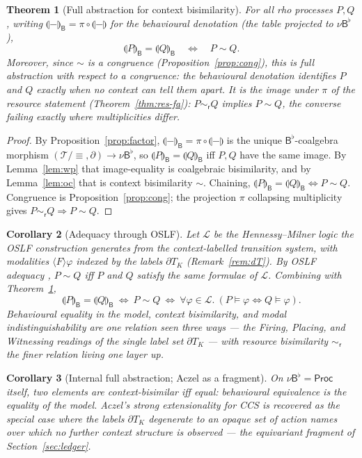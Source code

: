 \documentclass[11pt]{article}
\newcommand{\Proc}{\mathsf{Proc}}
\newcommand{\B}{\mathsf{B}}
\newcommand{\sem}[1]{\llparenthesis #1\rrparenthesis}   %
\newcommand{\bis}{\sim}
\newcommand{\scong}{\equiv}
\newcommand{\DK}{\partial T_{K}}               %
\newcommand{\resbis}{\sim_{\mathsf{r}}}        %
\theoremstyle{plain}
\newtheorem{theorem}{Theorem}
\newtheorem{corollary}[theorem]{Corollary}
\theoremstyle{definition}
\begin{document}
\begin{theorem}[Full abstraction for context bisimilarity]\label{thm:fa}
For all rho processes $P,Q$, writing $\sem{-}_{\B}=\pi\circ\sem{-}$ for the
behavioural denotation (the table projected to $\nu{\B^{\flat}}$),
\[
  \sem P_{\B}=\sem Q_{\B} \quad\Longleftrightarrow\quad P\bis Q .
\]
Moreover, since $\bis$ is a congruence (Proposition~\ref{prop:cong}), this is full
abstraction with respect to a congruence: the behavioural denotation identifies $P$
and $Q$ exactly when no context can tell them apart. It is the image under $\pi$ of
the resource statement (Theorem~\ref{thm:res-fa}): $P\resbis Q$ implies $P\bis Q$,
the converse failing exactly where multiplicities differ.
\end{theorem}
\begin{proof}
By Proposition~\ref{prop:factor}, $\sem{-}_{\B}=\pi\circ\sem{-}$ is the unique
$\B^{\flat}$-coalgebra morphism $(\mathcal T/{\scong},\partial)\to\nu{\B^{\flat}}$,
so $\sem P_{\B}=\sem Q_{\B}$ iff $P,Q$ have the same image. By Lemma~\ref{lem:wp}
that image-equality is coalgebraic bisimilarity, and by Lemma~\ref{lem:oc} that is
context bisimilarity $\bis$. Chaining, $\sem P_{\B}=\sem Q_{\B}\iff P\bis Q$.
Congruence is Proposition~\ref{prop:cong}; the projection $\pi$ collapsing
multiplicity gives $P\resbis Q\Rightarrow P\bis Q$.
\end{proof}

\begin{corollary}[Adequacy through OSLF]\label{cor:oslf}
Let $\mathcal L$ be the Hennessy--Milner logic the OSLF construction generates from
the context-labelled transition system, with modalities $\langle F\rangle\varphi$
indexed by the labels $\DK$ (Remark~\ref{rem:dT}). By OSLF adequacy
\cite{meredithwells}, $P\bis Q$ iff $P$ and $Q$ satisfy the same formulae of
$\mathcal L$. Combining with Theorem~\ref{thm:fa},
\[
  \sem P_{\B}=\sem Q_{\B}
  \ \Longleftrightarrow\
  P\bis Q
  \ \Longleftrightarrow\
  \forall\varphi\in\mathcal L.\ (P\models\varphi\Leftrightarrow Q\models\varphi).
\]
Behavioural equality in the model, context bisimilarity, and modal
indistinguishability are one relation seen three ways --- the Firing, Placing, and
Witnessing readings of the single label set $\DK$ --- with resource bisimilarity
$\resbis$ the finer relation living one layer up.
\end{corollary}

\begin{corollary}[Internal full abstraction; Aczel as a fragment]\label{cor:internal}
On $\nu{\B^{\flat}}=\Proc$ itself, two elements are context-bisimilar iff equal:
behavioural equivalence is the equality of the model. Aczel's strong extensionality
for CCS is recovered as the special case where the labels $\DK$ degenerate to an
opaque set of action names over which no further context structure is observed ---
the equivariant fragment of Section~\ref{sec:ledger}.
\end{corollary}
\end{document}
